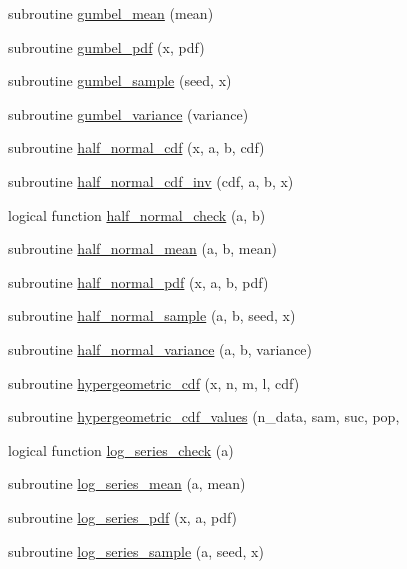 \begin{DoxyCompactItemize}
subroutine \hyperlink{subroutines_8f_ab25784871afe33475733991e2db8c754}{gumbel\+\_\+mean} (mean)
\item 
subroutine \hyperlink{subroutines_8f_a6d2003af12b56d5f9b0a816e24b5775c}{gumbel\+\_\+pdf} (x, pdf)
\item 
subroutine \hyperlink{subroutines_8f_a4eda1bafea5a35dad5e4d1f3c7c4c2fd}{gumbel\+\_\+sample} (seed, x)
\item 
subroutine \hyperlink{subroutines_8f_a0b9d97396f3f7a256ac7b587d8bf44d0}{gumbel\+\_\+variance} (variance)
\item 
subroutine \hyperlink{subroutines_8f_a151eb67716499cd4c2674750d365bbda}{half\+\_\+normal\+\_\+cdf} (x, a, b, cdf)
\item 
subroutine \hyperlink{subroutines_8f_ab3ab8dee9a6bab9e5f838055b6a15e32}{half\+\_\+normal\+\_\+cdf\+\_\+inv} (cdf, a, b, x)
\item 
logical function \hyperlink{subroutines_8f_aff12e14edd4bf669955f0a594154edf8}{half\+\_\+normal\+\_\+check} (a, b)
\item 
subroutine \hyperlink{subroutines_8f_a113c46e78879c405f2eac9a5ffc6df15}{half\+\_\+normal\+\_\+mean} (a, b, mean)
\item 
subroutine \hyperlink{subroutines_8f_ac348bef959fa6ccdecc97def06ad18e3}{half\+\_\+normal\+\_\+pdf} (x, a, b, pdf)
\item 
subroutine \hyperlink{subroutines_8f_ac04ea3c647fa31eab3b163f78f98e75b}{half\+\_\+normal\+\_\+sample} (a, b, seed, x)
\item 
subroutine \hyperlink{subroutines_8f_a3736473676f16f37ee61f098b0d84ab0}{half\+\_\+normal\+\_\+variance} (a, b, variance)
\item 
subroutine \hyperlink{subroutines_8f_af1aca52a5977f25a6cb499968b784a17}{hypergeometric\+\_\+cdf} (x, n, m, l, cdf)
\item 
subroutine \hyperlink{subroutines_8f_a6ebfe3df3fb5de745d4262003a563ca2}{hypergeometric\+\_\+cdf\+\_\+values} (n\+\_\+data, sam, suc, pop,
\item 
logical function \hyperlink{subroutines_8f_a904e056ded5ca1c2d426f58301050514}{log\+\_\+series\+\_\+check} (a)
\item 
subroutine \hyperlink{subroutines_8f_a3f4273816a7b8ae63fa685d5eb79e2b8}{log\+\_\+series\+\_\+mean} (a, mean)
\item 
subroutine \hyperlink{subroutines_8f_a1953093828435ce6e81bbe4921d20c77}{log\+\_\+series\+\_\+pdf} (x, a, pdf)
\item 
subroutine \hyperlink{subroutines_8f_acf82272a3993849e408a1b4ef2143c73}{log\+\_\+series\+\_\+sample} (a, seed, x)

\end{DoxyCompactItemize}
